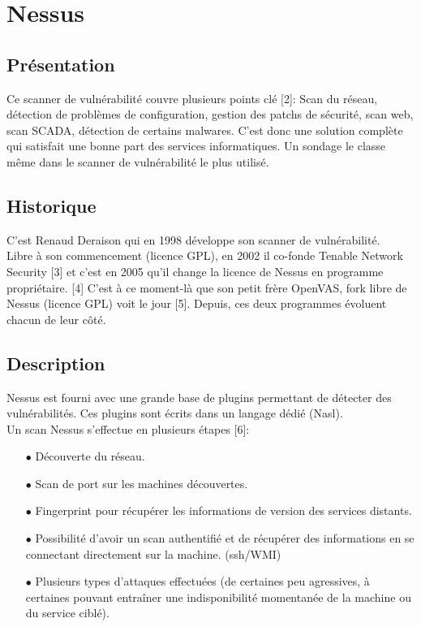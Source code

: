  \section{Nessus}
\thispagestyle{plain}
\subsection{Présentation}
Ce scanner de vulnérabilité couvre plusieurs points clé [2]: Scan du réseau, détection de problèmes de configuration, gestion des patchs de sécurité, scan web, scan SCADA, détection de certains malwares. C’est donc une solution complète qui satisfait une bonne part des services informatiques. Un sondage le classe même dans le scanner de vulnérabilité le plus utilisé.

\subsection{Historique}
C’est Renaud Deraison qui en 1998 développe son scanner de vulnérabilité.\\
Libre à son commencement (licence GPL), en 2002 il co-fonde Tenable Network Security [3] et c’est en 2005 qu’il change la licence de Nessus en programme propriétaire. [4] C’est à ce moment-là que son \og{}petit frère\fg{} OpenVAS, fork libre de Nessus (licence GPL) voit le jour [5]. Depuis, ces deux programmes évoluent chacun de leur côté.

\subsection{Description}
Nessus est fourni avec une grande base de plugins permettant de détecter des vulnérabilités. Ces plugins sont écrits dans un langage dédié (Nasl).\\
Un scan Nessus s’effectue en plusieurs étapes [6]:\\
\begin{itemize}
\item [$\bullet$]Découverte du réseau.\\
\item [$\bullet$]Scan de port sur les machines découvertes.\\
\item [$\bullet$]Fingerprint pour récupérer les informations de version des services distants.\\
\item [$\bullet$]Possibilité d’avoir un scan authentifié et de récupérer des informations en se connectant directement sur la machine. (ssh/WMI)\\
\item [$\bullet$]Plusieurs types d’attaques effectuées (de certaines peu agressives, à certaines pouvant entraîner une indisponibilité momentanée de la machine ou du service ciblé).\\
\end{itemize}

